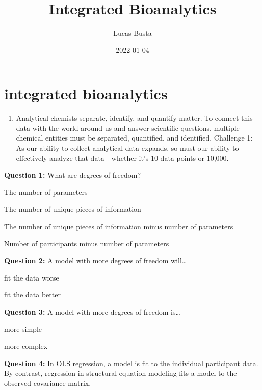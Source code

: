 \documentclass[
]{krantz}
\title{Integrated Bioanalytics}
\author{Lucas Busta}
\date{2022-01-04}
\providecommand{\tightlist}{%
  \setlength{\itemsep}{0pt}\setlength{\parskip}{0pt}}
\begin{document}
\maketitle

{
\setcounter{tocdepth}{2}
\tableofcontents
}
\hypertarget{integrated-bioanalytics}{%
\section*{integrated bioanalytics}\label{integrated-bioanalytics}}

\begin{enumerate}
\def\labelenumi{\arabic{enumi}.}
\tightlist
\item
  Analytical chemists separate, identify, and quantify matter. To connect this data with the world around us and answer scientific questions, multiple chemical entities must be separated, quantified, and identified. Challenge 1: As our ability to collect analytical data expands, so must our ability to effectively analyze that data - whether it's 10 data points or 10,000.
\end{enumerate}

\textbf{Question 1:}
What are degrees of freedom?

The number of parameters

The number of unique pieces of information

The number of unique pieces of information minus number of parameters

Number of participants minus number of parameters

\hypertarget{collapseExample1}{}
\hypertarget{answerFeedback1}{}

\textbf{Question 2:}
A model with more degrees of freedom will\ldots{}

fit the data worse

fit the data better

\hypertarget{collapseExample2}{}
\hypertarget{answerFeedback2}{}

\textbf{Question 3:}
A model with more degrees of freedom is\ldots{}

more simple

more complex

\hypertarget{collapseExample3}{}
\hypertarget{answerFeedback3}{}

\textbf{Question 4:}
In OLS regression, a model is fit to the individual participant data. By contrast, regression in structural equation modeling fits a model to the observed covariance matrix.
\end{document}
